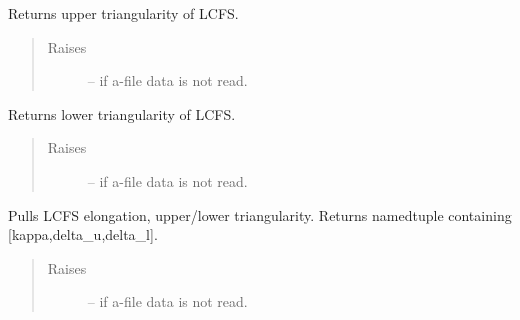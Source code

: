 \documentclass[letterpaper,10pt,english]{sphinxmanual}
\begin{document}
\begin{fulllineitems}
\begin{fulllineitems}
\label{eqtools:eqtools.eqdskreader.EqdskReader.getUpperTriangularity}
Returns upper triangularity of LCFS.
\begin{quote}\begin{description}
\item[{Raises }] \leavevmode
{} -- 
if a-file data is not read.

\end{description}\end{quote}

\end{fulllineitems}


\begin{fulllineitems}
\label{eqtools:eqtools.eqdskreader.EqdskReader.getLowerTriangularity}
Returns lower triangularity of LCFS.
\begin{quote}\begin{description}
\item[{Raises }] \leavevmode
{} -- 
if a-file data is not read.

\end{description}\end{quote}

\end{fulllineitems}


\begin{fulllineitems}
\label{eqtools:eqtools.eqdskreader.EqdskReader.getShaping}
Pulls LCFS elongation, upper/lower triangularity.
Returns namedtuple containing {[}kappa,delta\_u,delta\_l{]}.
\begin{quote}\begin{description}
\item[{Raises }] \leavevmode
{} -- 
if a-file data is not read.

\end{description}\end{quote}

\end{fulllineitems}



\end{fulllineitems}
\end{document}
